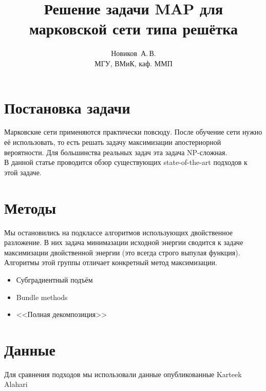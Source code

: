 \documentclass{article}
\title
    {Решение задачи MAP для марковской сети типа решётка}
\author
    {Новиков~А.\,В.\\
    МГУ, ВМиК, каф. ММП}
\begin{document}
\maketitle

\pagebreak

\section{Постановка задачи}
Марковские сети применяются практически повсюду.
После обучение сети нужно её использовать,
то есть решать задачу максимизации апостериорной вероятности.
Для большинства реальных задач эта задача NP-сложная.\\
В данной статье проводится обзор существующих
state-of-the-art подходов к этой задаче.
\pagebreak

\section{Методы}
Мы остановились на подклассе алгоритмов использующих
двойственное разложение. В них задача минимазации
исходной энергии сводится к задаче максимизации
двойственной энергии (это всегда строго выпулая функция).
Алгоритмы этой группы отличает конкретный метод максимизации.
\begin{itemize}
\item Субградиентный подъём~\cite{Subgradient}
\item Bundle methods~\cite{Bundle}
\item <<Полная декомпозиция>>
\end{itemize}
\pagebreak

\section{Данные}
Для сравнения подходов мы использовали данные
опубликованные Karteek Alahari~\cite{Alahari}
\pagebreak
\end{document}
